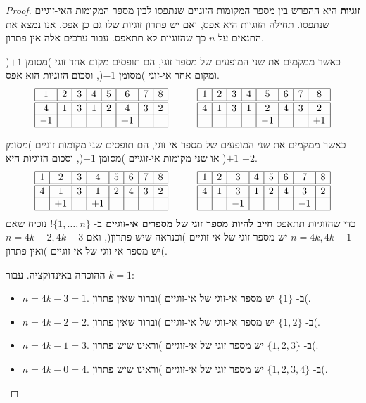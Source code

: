 \begin{proof}
\textbf{זוגיות}
היא ההפרש בין מספר המקומות הזוגיים שנתפסו לבין מספר המקומות האי-זוגיים שנתפסו. תחילה הזוגיות היא אפס, ואם יש פתרון זוגיות שלו גם כן אפס. אנו נמצא את התנאים על 
$n$ 
כך שהזוגיות לא תתאפס. עבור ערכים אלה אין פתרון.

כאשר ממקמים את שני המופעים של מספר זוגי, הם תופסים מקום אחד זוגי )מסומן 
$+1$(
ומקום אחר אי-זוגי )מסומן 
$-1$(,
וסכום הזוגיות הוא אפס.
\[
\begin{array}{|c|c|c|c|c|c|c|c|}
\hline
1&2&3&4&5&6&7&8\\
\hline\hline
4&1&3&1&2&4&3&2\\\hline
-1&&&&&+1&&\\\hline
\end{array}
\hspace{3em}
\begin{array}{|c|c|c|c|c|c|c|c|}
\hline
1&2&3&4&5&6&7&8\\
\hline\hline
4&1&3&1&2&4&3&2\\\hline
&&&&-1&&&+1\\\hline
\end{array}
\]

כאשר ממקמים את שני המופעים של מספר אי-זוגי,  הם תופסים שני מקומות זוגיים )מסומן 
$+1$(
או שני מקומות אי-זוגיים )מסומן 
$-1$(,
וסכום הזוגיות היא
$\pm 2$.
\[
\begin{array}{|c|c|c|c|c|c|c|c|}
\hline
1&2&3&4&5&6&7&8\\
\hline\hline
4&1&3&1&2&4&3&2\\\hline
&+1&&+1&&&&\\\hline
\end{array}
\hspace{3em}
\begin{array}{|c|c|c|c|c|c|c|c|}
\hline
1&2&3&4&5&6&7&8\\
\hline\hline
4&1&3&1&2&4&3&2\\\hline
&&-1&&&&-1&\\\hline
\end{array}
\]
כדי שהזוגיות תתאפס
\textbf{חייב להיות מספר זוגי של מספרים אי-זוגיים ב}-%
$\{1,\ldots,n\}$!
נוכיח שאם 
$n=4k, 4k\!-\!1$
יש מספר זוגי של אי-זוגיים )וכנראה שיש פתרון(,
ואם
$n=4k\!-\!2, 4k\!-\!3$
יש מספר אי-זוגי של אי-זוגיים )ואין פתרון(.

ההוכחה באינדוקציה. עבור 
$k=1$:
\begin{itemize}
\item $n=4k-3=1$.
ב-%
$\{1\}$
יש מספר אי-זוגי של אי-זוגיים )וברור שאין פתרון(.
\item $n=4k-2=2$.
ב-%
$\{1,2\}$
יש מספר אי-זוגי של אי-זוגיים )וברור שאין פתרון(.
\item $n=4k-1=3$.
ב-%
$\{1,2,3\}$
יש מספר זוגי של אי-זוגיים )וראינו שיש פתרון(.
\item $n=4k-0=4$.
ב-%
$\{1,2,3,4\}$
יש מספר זוגי של אי-זוגיים )וראינו שיש פתרון(.
\end{itemize}


\end{proof}
